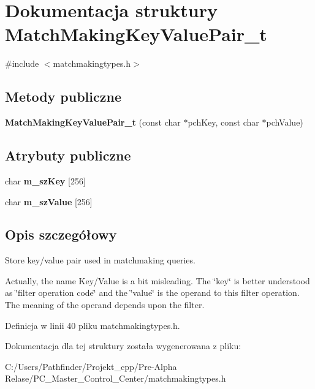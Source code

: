 \hypertarget{struct_match_making_key_value_pair__t}{}\section{Dokumentacja struktury Match\+Making\+Key\+Value\+Pair\+\_\+t}
\label{struct_match_making_key_value_pair__t}


{\ttfamily \#include $<$matchmakingtypes.\+h$>$}

\subsection*{Metody publiczne}
\begin{DoxyCompactItemize}
\item 
\mbox{\label{struct_match_making_key_value_pair__t_a8ce8c21742212fbea096ec042d579d44}} 
{\bfseries Match\+Making\+Key\+Value\+Pair\+\_\+t} (const char $\ast$pch\+Key, const char $\ast$pch\+Value)
\end{DoxyCompactItemize}
\subsection*{Atrybuty publiczne}
\begin{DoxyCompactItemize}
\item 
\mbox{\label{struct_match_making_key_value_pair__t_acd06bbb534e7a2b45832d2bf880e02d5}} 
char {\bfseries m\+\_\+sz\+Key} \mbox{[}256\mbox{]}
\item 
\mbox{\label{struct_match_making_key_value_pair__t_ab6b45ed80df187fa469f8bc01f6286f9}} 
char {\bfseries m\+\_\+sz\+Value} \mbox{[}256\mbox{]}
\end{DoxyCompactItemize}


\subsection{Opis szczegółowy}
Store key/value pair used in matchmaking queries.

Actually, the name Key/\+Value is a bit misleading. The \char`\"{}key\char`\"{} is better understood as \char`\"{}filter operation code\char`\"{} and the \char`\"{}value\char`\"{} is the operand to this filter operation. The meaning of the operand depends upon the filter. 

Definicja w linii 40 pliku matchmakingtypes.\+h.



Dokumentacja dla tej struktury została wygenerowana z pliku\+:\begin{DoxyCompactItemize}
\item 
C\+:/\+Users/\+Pathfinder/\+Projekt\+\_\+cpp/\+Pre-\/\+Alpha Relase/\+P\+C\+\_\+\+Master\+\_\+\+Control\+\_\+\+Center/matchmakingtypes.\+h\end{DoxyCompactItemize}
